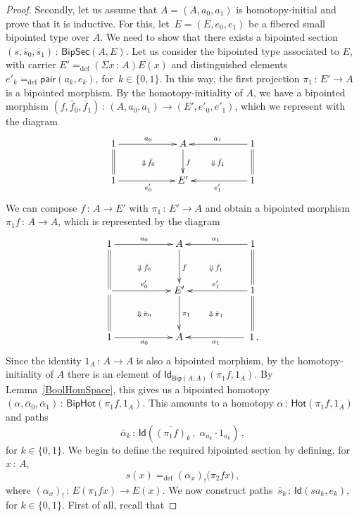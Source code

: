 \documentclass[10pt,a4paper,oneside,reqno]{amsart}
\numberwithin{equation}{section}
\theoremstyle{mythm}
\theoremstyle{mydef}
\theoremstyle{myrmk}
\newcommand{\defeq}{=_{\mathrm{def}}}
\newcommand{\co}{\,{:}\,}
\newcommand{\Hot}{\mathsf{Hot}}
\newcommand{\Id}{\mathsf{Id}}
\newcommand{\pair}{\mathsf{pair}}
\newcommand{\Bip}{\mathsf{Bip}}
\newcommand{\BipHot}{\mathsf{BipHot}}
\newcommand{\BipSec}{\mathsf{BipSec}}
\begin{document}
\begin{proof}
Secondly, let us assume that $A = (A, a_0, a_1)$ is homotopy-initial and prove that it is inductive. 
For this, let~$E = (E, e_0, e_1)$ be a fibered small bipointed type over $A$. We need to show that there
exists a bipointed section $(s, \bar{s}_0, \bar{s}_1) \co \BipSec(A,E)$.
Let us consider the bipointed type associated to $E$, with carrier 
$E' \defeq (\Sigma x \co A) E(x)$ 
and distinguished elements  $e'_k \defeq \pair(a_k, e_k)$, 
for~$k \in \{ 0, 1 \}$. In this way,  the first projection $\pi_1 \co 
E' \to A$ is a bipointed morphism. By the homotopy-initiality of $A$, we have a bipointed morphism 
$(f, \bar{f}_0, \bar{f}_1) \co (A, a_0, a_1)  \to (E', e'_0, e'_1)$, 
which we represent with the diagram
\[
\xymatrix@C=2cm{
1 \ar[r]^{a_0} \ar@{=}[d] \ar@{}[dr]|{\Downarrow \, \bar{f}_0} & A  \ar[d]^f & 1 \ar[l]_{a_1} \ar@{=}[d]
 \ar@{}[dl]|{\Downarrow \, \bar{f}_1}   \\
1 \ar[r]_{e'_0}  & E' & 1 \ar[l]^{e'_1} }
 \]
 We can compose $f \co A \to E'$ with $\pi_1 \co E' \to A$ and obtain a bipointed morphism $\pi_1  f \co A \to A$, which is represented by the diagram
  \[
\xymatrix@C=2cm@R=1.2cm{
1  \ar[r]^{a_0} \ar@{=}[d]  \ar@{}[dr]|{\Downarrow \, \bar{f}_0}  & A  \ar[d]^f & 1 \ar[l]_{a_1}  \ar@{=}[d]  
 \ar@{}[dl]|{\Downarrow \, \bar{f}_1} \\
\ar[r]^{e'_0} \ar@{=}[d]   \ar@{}[dr]|{\Downarrow \, \bar{\pi}_0}  & E' \ar[d]^{\pi_1}  & 1 \ar[l]_{e'_1} \ar@{=}[d] 
 \ar@{}[dl]|{\Downarrow \, \bar{\pi}_1}  \\
1 \ar[r]_{a_0} & A &  \; 1  \, . \ar[l]^{a_1}}
 \]
Since the identity $1_A \co A \to A$ is also a bipointed morphism, by the homotopy-initiality of $A$ there is an element of $\Id_{\Bip(A,A)}(\pi_1  f, 1_A)$. 
 By Lemma~\ref{BoolHomSpace}, this gives us a bipointed homotopy $(\alpha,
\bar{\alpha}_0,\bar{\alpha}_1) \co \BipHot( \pi_1  f , 1_A)$. This amounts to a homotopy $\alpha \co \Hot(\pi_1 
 f, 1_A)$ and paths
\begin{equation*}
\bar{\alpha}_k \co  \Id( \overline{(\pi_1  f)}_k \, , \;  \alpha_{a_k} \cdot 1_{a_k} ) \, ,
\end{equation*}
for $k \in \{ 0, 1 \}$. We begin to define the required bipointed section by defining, for~$x \co A$, 
\begin{equation*}
s(x) \defeq (\alpha_x)_{!} \big( \pi_2 f  x \big) \, ,
\end{equation*}
where $(\alpha_x)_{!} \co E(\pi_1 f x) \to E(x)$. 
We now construct  paths~$\bar{s}_k \co \Id(s a_k, e_k)$, for $k \in \{ 0, 1 \}$. First of all, recall that 

\end{proof}
\end{document}

